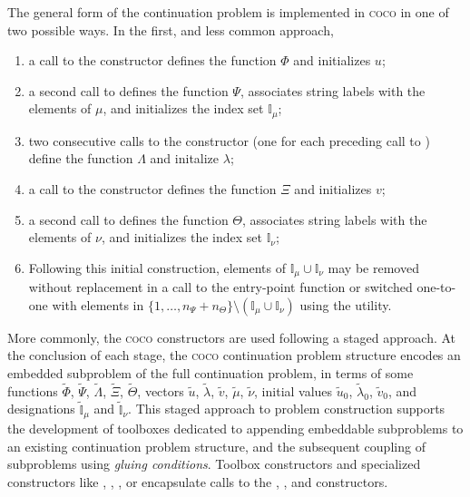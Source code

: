 The general form of the continuation problem is implemented in \textsc{coco} in one of two possible ways. In the first, and less common approach, 
\begin{enumerate}
\item a call to the  constructor defines the function $\Phi$ and initializes $u$;
\item a second call to  defines the function $\Psi$, associates string labels with the elements of $\mu$, and initializes the index set $\mathbb{I}_\mu$;
\item two consecutive calls to the  constructor (one for each preceding call to ) define the function $\Lambda$ and initalize $\lambda$;
\item a call to the  constructor defines the function $\Xi$ and initializes $v$;
\item a second call to  defines the function $\Theta$, associates string labels with the elements of $\nu$, and initializes the index set $\mathbb{I}_\nu$;
\item Following this initial construction, elements of $\mathbb{I}_\mu\cup\mathbb{I}_\nu$ may be removed without replacement in a call to the  entry-point function or switched one-to-one with elements in $\{1,\ldots,n_\Psi+n_\Theta\}\setminus\left(\mathbb{I}_\mu\cup\mathbb{I}_\nu\right)$ using the  utility.
\end{enumerate}
More commonly, the \textsc{coco} constructors are used following a staged approach. At the conclusion of each stage, the \textsc{coco} continuation problem structure encodes an embedded subproblem of the full continuation problem, in terms of some functions $\tilde{\Phi}$, $\tilde{\Psi}$, $\tilde{\Lambda}$, $\tilde{\Xi}$, $\tilde{\Theta}$, vectors $\tilde{u}$, $\tilde{\lambda}$, $\tilde{v}$, $\tilde{\mu}$, $\tilde{\nu}$, initial values $\tilde{u}_0$, $\tilde{\lambda}_0$, $\tilde{v}_0$, and designations $\tilde{\mathbb{I}}_\mu$ and $\tilde{\mathbb{I}}_\nu$. This staged approach to problem construction supports the development of toolboxes dedicated to appending embeddable subproblems to an existing continuation problem structure, and the subsequent coupling of subproblems using \emph{gluing conditions}. Toolbox constructors and specialized constructors like , , , or  encapsulate calls to the , , and  constructors.

